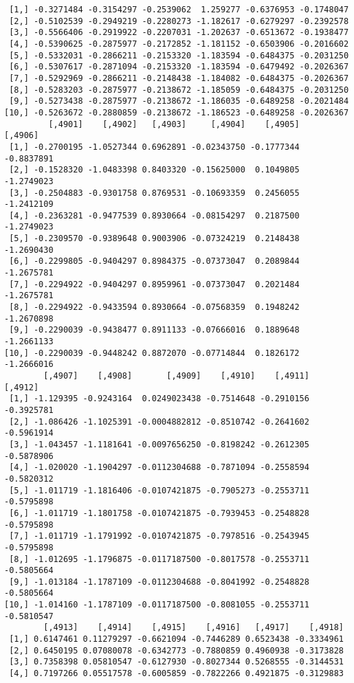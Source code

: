\documentclass[
  letterpaper,
  DIV=11,
  numbers=noendperiod]{scrreprt}
\begin{document}
\begin{verbatim}
 [1,] -0.3271484 -0.3154297 -0.2539062  1.259277 -0.6376953 -0.1748047
 [2,] -0.5102539 -0.2949219 -0.2280273 -1.182617 -0.6279297 -0.2392578
 [3,] -0.5566406 -0.2919922 -0.2207031 -1.202637 -0.6513672 -0.1938477
 [4,] -0.5390625 -0.2875977 -0.2172852 -1.181152 -0.6503906 -0.2016602
 [5,] -0.5332031 -0.2866211 -0.2153320 -1.183594 -0.6484375 -0.2031250
 [6,] -0.5307617 -0.2871094 -0.2153320 -1.183594 -0.6479492 -0.2026367
 [7,] -0.5292969 -0.2866211 -0.2148438 -1.184082 -0.6484375 -0.2026367
 [8,] -0.5283203 -0.2875977 -0.2138672 -1.185059 -0.6484375 -0.2031250
 [9,] -0.5273438 -0.2875977 -0.2138672 -1.186035 -0.6489258 -0.2021484
[10,] -0.5263672 -0.2880859 -0.2138672 -1.186523 -0.6489258 -0.2026367
         [,4901]    [,4902]   [,4903]     [,4904]    [,4905]    [,4906]
 [1,] -0.2700195 -1.0527344 0.6962891 -0.02343750 -0.1777344 -0.8837891
 [2,] -0.1528320 -1.0483398 0.8403320 -0.15625000  0.1049805 -1.2749023
 [3,] -0.2504883 -0.9301758 0.8769531 -0.10693359  0.2456055 -1.2412109
 [4,] -0.2363281 -0.9477539 0.8930664 -0.08154297  0.2187500 -1.2749023
 [5,] -0.2309570 -0.9389648 0.9003906 -0.07324219  0.2148438 -1.2690430
 [6,] -0.2299805 -0.9404297 0.8984375 -0.07373047  0.2089844 -1.2675781
 [7,] -0.2294922 -0.9404297 0.8959961 -0.07373047  0.2021484 -1.2675781
 [8,] -0.2294922 -0.9433594 0.8930664 -0.07568359  0.1948242 -1.2670898
 [9,] -0.2290039 -0.9438477 0.8911133 -0.07666016  0.1889648 -1.2661133
[10,] -0.2290039 -0.9448242 0.8872070 -0.07714844  0.1826172 -1.2666016
        [,4907]    [,4908]       [,4909]    [,4910]    [,4911]    [,4912]
 [1,] -1.129395 -0.9243164  0.0249023438 -0.7514648 -0.2910156 -0.3925781
 [2,] -1.086426 -1.1025391 -0.0004882812 -0.8510742 -0.2641602 -0.5961914
 [3,] -1.043457 -1.1181641 -0.0097656250 -0.8198242 -0.2612305 -0.5878906
 [4,] -1.020020 -1.1904297 -0.0112304688 -0.7871094 -0.2558594 -0.5820312
 [5,] -1.011719 -1.1816406 -0.0107421875 -0.7905273 -0.2553711 -0.5795898
 [6,] -1.011719 -1.1801758 -0.0107421875 -0.7939453 -0.2548828 -0.5795898
 [7,] -1.011719 -1.1791992 -0.0107421875 -0.7978516 -0.2543945 -0.5795898
 [8,] -1.012695 -1.1796875 -0.0117187500 -0.8017578 -0.2553711 -0.5805664
 [9,] -1.013184 -1.1787109 -0.0112304688 -0.8041992 -0.2548828 -0.5805664
[10,] -1.014160 -1.1787109 -0.0117187500 -0.8081055 -0.2553711 -0.5810547
        [,4913]    [,4914]    [,4915]    [,4916]   [,4917]    [,4918]
 [1,] 0.6147461 0.11279297 -0.6621094 -0.7446289 0.6523438 -0.3334961
 [2,] 0.6450195 0.07080078 -0.6342773 -0.7880859 0.4960938 -0.3173828
 [3,] 0.7358398 0.05810547 -0.6127930 -0.8027344 0.5268555 -0.3144531
 [4,] 0.7197266 0.05517578 -0.6005859 -0.7822266 0.4921875 -0.3129883

\end{verbatim}
\end{document}
